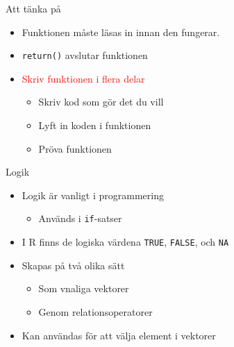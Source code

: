 \documentclass[
  10pt,
  ignorenonframetext,
]{beamer}
\providecommand{\tightlist}{%
  \setlength{\itemsep}{0pt}\setlength{\parskip}{0pt}}
\begin{document}
\begin{frame}{Att tänka på}
\protect\hypertarget{att-tuxe4nka-puxe5}{}
\begin{itemize}
\tightlist
\item
  Funktionen måste läsas in innan den fungerar.
\item
  \texttt{return()} avslutar funktionen
\item
  \textcolor{red}{Skriv funktionen i flera delar}

  \begin{itemize}
  \tightlist
  \item
    Skriv kod som gör det du vill
  \item
    Lyft in koden i funktionen
  \item
    Pröva funktionen
  \end{itemize}
\end{itemize}
\end{frame}

\begin{frame}{Logik}
\protect\hypertarget{logik}{}
\begin{itemize}
\tightlist
\item
  Logik är vanligt i programmering

  \begin{itemize}
  \tightlist
  \item
    Används i \texttt{if}-satser
  \end{itemize}
\item
  I R finns de logiska värdena \texttt{TRUE}, \texttt{FALSE}, och
  \texttt{NA}
\item
  Skapas på två olika sätt

  \begin{itemize}
  \tightlist
  \item
    Som vnaliga vektorer
  \item
    Genom relationsoperatorer
  \end{itemize}
\item
  Kan användas för att välja element i vektorer
\end{itemize}
\end{frame}
\end{document}
